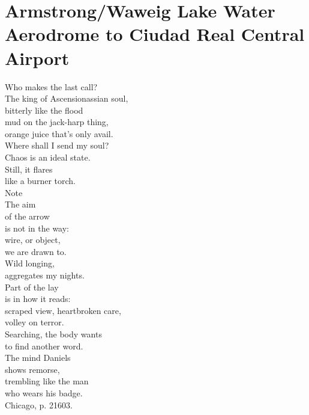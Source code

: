 \documentclass[smalldemyvopaper,11pt,twoside,onecolumn,openright,extrafontsizes]{memoir}
\begin{document}
\chapter{Armstrong/Waweig Lake Water Aerodrome to Ciudad Real Central Airport}
Who makes the last call?
\\The king of Ascensionassian soul,
\\bitterly like the flood
\\mud on the jack-harp thing,
\\orange juice that's only avail.
\\Where shall I send my soul?
\\Chaos is an ideal state.
\\Still, it flares
\\like a burner torch.
\\Note
\\The aim
\\of the arrow
\\is not in the way:
\\wire, or object,
\\we are drawn to.
\\Wild longing,
\\aggregates my nights.
\\Part of the lay
\\is in how it reads:
\\scraped view, heartbroken care,
\\volley on terror.
\\Searching, the body wants
\\to find another word.
\\The mind Daniels
\\shows remorse,
\\trembling like the man
\\who wears his badge.
\\Chicago, p. 21603.
\end{document}
